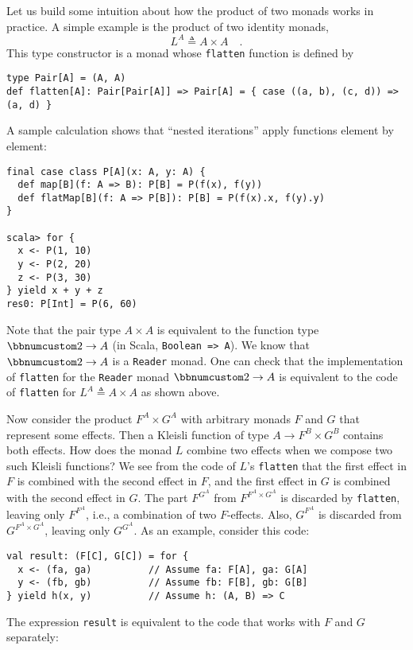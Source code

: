 Let us build some intuition about how the product of two monads works
in practice. A simple example is the product of two identity monads,
\[
L^{A}\triangleq A\times A\quad.
\]
This type constructor is a monad whose \lstinline!flatten! function
is defined by
\begin{lstlisting}
type Pair[A] = (A, A)
def flatten[A]: Pair[Pair[A]] => Pair[A] = { case ((a, b), (c, d)) => (a, d) }
\end{lstlisting}
A sample calculation shows that \textsf{``}nested iterations\textsf{''} apply functions
element by element:
\begin{lstlisting}
final case class P[A](x: A, y: A) {
  def map[B](f: A => B): P[B] = P(f(x), f(y))
  def flatMap[B](f: A => P[B]): P[B] = P(f(x).x, f(y).y)
}

scala> for {
  x <- P(1, 10)
  y <- P(2, 20)
  z <- P(3, 30)
} yield x + y + z
res0: P[Int] = P(6, 60)
\end{lstlisting}

Note that the pair type $A\times A$ is equivalent to the function
type $\bbnum 2\rightarrow A$ (in Scala, \lstinline!Boolean => A!).
We know that $\bbnum 2\rightarrow A$ is a \lstinline!Reader! monad.
One can check that the implementation of \lstinline!flatten! for
the \lstinline!Reader! monad $\bbnum 2\rightarrow A$ is equivalent
to the code of \lstinline!flatten! for $L^{A}\triangleq A\times A$
as shown above.

Now consider the product $F^{A}\times G^{A}$ with arbitrary monads
$F$ and $G$ that represent some effects. Then a Kleisli function
of type $A\rightarrow F^{B}\times G^{B}$ contains both effects. How
does the monad $L$ combine two effects when we compose two such Kleisli
functions? We see from the code of $L$\textsf{'}s \lstinline!flatten! that
the first effect in $F$ is combined with the second effect in $F$,
and the first effect in $G$ is combined with the second effect in
$G$. The part $F^{G^{A}}$ from $F^{F^{A}\times G^{A}}$ is discarded
by \lstinline!flatten!, leaving only $F^{F^{A}}$, i.e., a combination
of two $F$-effects. Also, $G^{F^{A}}$ is discarded from $G^{F^{A}\times G^{A}}$,
leaving only $G^{G^{A}}$. As an example, consider this code:
\begin{lstlisting}
val result: (F[C], G[C]) = for {
  x <- (fa, ga)          // Assume fa: F[A], ga: G[A]
  y <- (fb, gb)          // Assume fb: F[B], gb: G[B]
} yield h(x, y)          // Assume h: (A, B) => C
\end{lstlisting}
The expression \lstinline!result! is equivalent to the code that
works with $F$ and $G$ separately:\vspace{-0.95\baselineskip}

